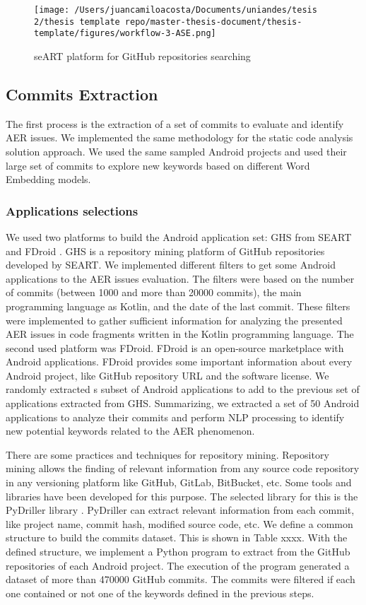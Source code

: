 \begin{figure}[h]
    	\centering
    		\texttt{[image: /Users/juancamiloacosta/Documents/uniandes/tesis 2/thesis template repo/master-thesis-document/thesis-template/figures/workflow-3-ASE.png]}
   			 \caption{seART platform for GitHub repositories searching \cite{} }
   			 \label{fig:ast}
\end{figure}

\subsection{Commits Extraction}
The first process is the extraction of a set of commits to evaluate and identify AER issues. We implemented the same methodology for the static code analysis solution approach. We used the same sampled Android projects and used their large set of commits to explore new keywords based on different Word Embedding models.

\subsubsection{Applications selections}
We used two platforms to build the Android application set: GHS from SEART and FDroid \cite{seart,fdroid}. GHS is a repository mining platform of GitHub repositories developed by SEART. We implemented different filters to get some Android applications to the AER issues evaluation. The filters were based on the number of commits (between 1000 and more than 20000 commits), the main programming language as Kotlin, and the date of the last commit. These filters were implemented to gather sufficient information for analyzing the presented AER issues in code fragments written in the Kotlin programming language.
The second used platform was FDroid. FDroid is an open-source marketplace with Android applications. FDroid provides some important information about every Android project, like GitHub repository URL and the software license. We randomly extracted s subset of Android applications to add to the previous set of applications extracted from GHS. Summarizing, we extracted a set of 50 Android applications to analyze their commits and perform NLP processing to identify new potential keywords related to the AER phenomenon.

There are some practices and techniques for repository mining. Repository mining allows the finding of relevant information from any source code repository in any versioning platform like GitHub, GitLab, BitBucket, etc. Some tools and libraries have been developed for this purpose. The selected library for this is the PyDriller library \cite{pydriller}.  PyDriller can extract relevant information from each commit, like project name, commit hash, modified source code, etc. We define a common structure to build the commits dataset. This is shown in Table xxxx.  With the defined structure, we implement a Python program to extract from the GitHub repositories of each Android project. The execution of the program generated a dataset of more than 470000 GitHub commits. The commits were filtered if each one contained or not one of the keywords defined in the previous steps.

